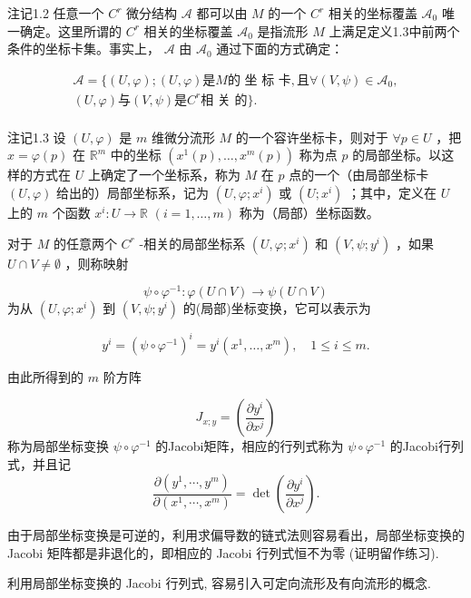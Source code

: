 注记1.2 任意一个  $C^r$  微分结构  $\mathcal{A}$  都可以由  $M$  的一个  $C^r$  相关的坐标覆盖  $\mathcal{A}_0$  唯一确定。这里所谓的  $C^r$  相关的坐标覆盖  $\mathcal{A}_0$  是指流形  $M$  上满足定义1.3中前两个条件的坐标卡集。事实上， $\mathcal{A}$  由  $\mathcal{A}_0$  通过下面的方式确定：

$$
\begin{array}{l} \mathcal {A} = \{(U, \varphi); (U, \varphi) \text {是} M   \text {的 坐 标 卡},   \text {且}   \forall (V, \psi) \in \mathcal {A} _ {0}, \\ (U, \varphi) \text {与} (V, \psi) \text {是} C ^ {r} \text {相 关 的} \}. 
\\ \end{array}
$$

注记1.3 设  $(U, \varphi)$  是  $m$  维微分流形  $M$  的一个容许坐标卡，则对于  $\forall p \in U$ ，把  $x = \varphi(p)$  在  $\mathbb{R}^m$  中的坐标  $(x^1(p), \dots, x^m(p))$  称为点  $p$  的局部坐标。以这样的方式在  $U$  上确定了一个坐标系，称为  $M$  在  $p$  点的一个（由局部坐标卡  $(U, \varphi)$  给出的）局部坐标系，记为  $(U, \varphi; x^i)$  或  $(U; x^i)$ ；其中，定义在  $U$  上的  $m$  个函数  $x^i: U \to \mathbb{R}$ $(i = 1, \dots, m)$  称为（局部）坐标函数。

对于  $M$  的任意两个  $C^r$ -相关的局部坐标系  $(U, \varphi; x^i)$  和  $(V, \psi; y^i)$ ，如果  $U \cap V \neq \emptyset$ ，则称映射

$$
\psi \circ \varphi^ {- 1}: \varphi (U \cap V) \rightarrow \psi (U \cap V)
$$
为从  $(U,\varphi ;x^i)$  到  $(V,\psi ;y^{i})$  的(局部)坐标变换，它可以表示为

$$
y ^ {i} = (\psi \circ \varphi^ {- 1}) ^ {i} = y ^ {i} (x ^ {1}, \dots , x ^ {m}), \quad 1 \leqslant i \leqslant m.
$$

由此所得到的  $m$  阶方阵

$$
J _ {x; y} = \left(\frac {\partial y ^ {i}}{\partial x ^ {j}}\right)
$$
称为局部坐标变换  $\psi \circ \varphi^{-1}$  的Jacobi矩阵，相应的行列式称为  $\psi \circ \varphi^{-1}$  的Jacobi行列式，并且记
$$
\frac {\partial \left(y ^ {1} , \cdots , y ^ {m}\right)}{\partial \left(x ^ {1} , \cdots , x ^ {m}\right)} = \det  \left(\frac {\partial y ^ {i}}{\partial x ^ {j}}\right).
$$

由于局部坐标变换是可逆的，利用求偏导数的链式法则容易看出，局部坐标变换的 Jacobi 矩阵都是非退化的，即相应的 Jacobi 行列式恒不为零 (证明留作练习).

利用局部坐标变换的 Jacobi 行列式, 容易引入可定向流形及有向流形的概念.

